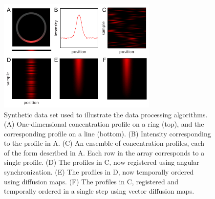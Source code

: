 \begin{figure}
\centering
\includegraphics[width=0.7\textwidth]{ch-drosophila/figures/figS2}
\caption[Synthetic data set used to illustrate registration and ordering algorithms]{Synthetic data set used to illustrate the data processing algorithms. (A) One-dimensional concentration profile on a ring (top), and the corresponding profile on a line (bottom). (B) Intensity corresponding to the profile in A. (C) An ensemble of concentration profiles, each of the form described in A. Each row in the array corresponds to a single profile. {(D)} The profiles in {C}, now registered using angular synchronization. {(E)} The profiles in {D}, now temporally ordered using diffusion maps.  {(F)} The profiles in {C}, registered and temporally ordered in a single step using vector diffusion maps.}
\label{fig:1d_demo}
\end{figure}

